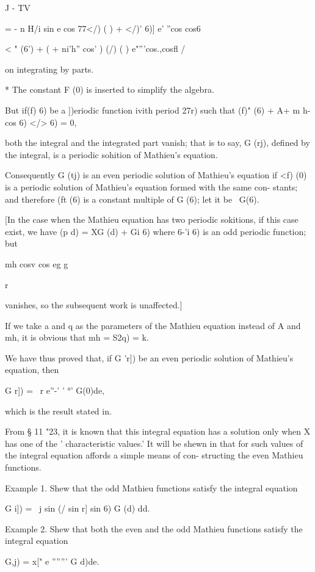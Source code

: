 J - TV

= - n H/i sin e cos 77</) ( ) + </)' 6)] e' ''cos cos6

 < " (6') + ( + ni'h'' cos' ) (/) ( ) e"'''cos.,cosfl /

on integrating by parts.

* The constant F (0) is inserted to simplify the algebra.

%
%

But if(f) 6) be a ])eriodic function ivith period 27r) such that (f)"
(6) + A+ m h- cos 6) </> 6) = 0,

both the integral and the integrated part vanish; that is to say, G
(rj), defined by the integral, is a periodic sohition of Mathieu's
equation.

Consequently G (tj) is an even periodic solution of Mathieu's equation
if <f) (0) is a periodic solution of Mathieu's equation formed with
the same con- stants; and therefore (ft (6) is a constant multiple of
G (6); let it be \ G(6).

[In the case when the Mathieu equation has two periodic sokitions, if
this case exist, we have (p d) = XG (d) + Gi 6) where 6-'i 6) is an
odd periodic function; but

 mh cosv cos eg g

r

vanishes, so the subsequent work is unaffected.]

If we take a and q as the parameters of the Mathieu equation instead
of A and mh, it is obvious that mh = \/ S2q) = k.

We have thus proved that, if G 'r]) be an even periodic solution of
Mathieu's equation, then

G r]) = \ r e''-' ' °' G(0)de,

which is the result stated in.

From § 11 "23, it is known that this integral equation has a solution
only when X has one of the ' characteristic values.' It will be shewn
in that for such values of \, the integral equation affords a
simple means of con- structing the even Mathieu functions.

Example 1. Shew that the odd Mathieu functions satisfy the integral
equation

G i]) = \ j sin (/ sin r] sin 6) G (d) dd.

Example 2. Shew that both the even and the odd Mathieu functions
satisfy the integral equation

G,j) = x[" e ''''''' G d)de.

